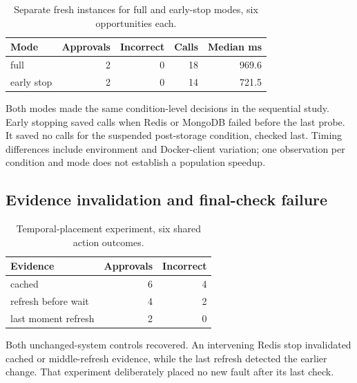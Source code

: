 \documentclass[manuscript,review,nonacm]{acmart}
\begin{document}
\begin{table}[t]
\caption{Separate fresh instances for full and early-stop modes, six opportunities each.}
\label{tab:mode-2-5}
\centering
\begin{tabularx}{\linewidth}{@{}Xrrrr@{}}
\toprule
Mode & Approvals & Incorrect & Calls & Median ms \\
\midrule
full & 2 & 0 & 18 & 969.6 \\
early stop & 2 & 0 & 14 & 721.5 \\
\bottomrule
\end{tabularx}
\end{table}
Both modes made the same condition-level decisions in the sequential study. Early stopping saved calls when Redis or MongoDB failed before the last probe. It saved no calls for the suspended post-storage condition, checked last. Timing differences include environment and Docker-client variation; one observation per condition and mode does not establish a population speedup.

\subsection{Evidence invalidation and final-check failure}
\begin{table}[t]
\caption{Temporal-placement experiment, six shared action outcomes.}
\label{tab:evidence-3-3}
\centering
\begin{tabularx}{\linewidth}{@{}Xrr@{}}
\toprule
Evidence & Approvals & Incorrect \\
\midrule
cached & 6 & 4 \\
refresh before wait & 4 & 2 \\
last moment refresh & 2 & 0 \\
\bottomrule
\end{tabularx}
\end{table}
Both unchanged-system controls recovered. An intervening Redis stop invalidated cached or middle-refresh evidence, while the last refresh detected the earlier change. That experiment deliberately placed no new fault after its last check.
\end{document}

